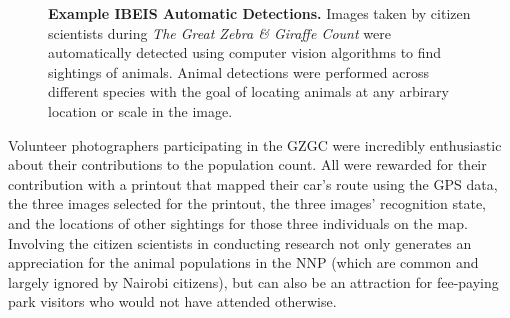 \begin{figure}[t]
    \caption[Example IBEIS Automatic Detections]{\textbf{Example IBEIS Automatic Detections.}  Images taken by citizen scientists during \textit{The Great Zebra \& Giraffe Count} were automatically detected using computer vision algorithms to find sightings of animals.  Animal detections were performed across different species with the goal of locating animals at any arbirary location or scale in the image.}
        \label{fig:detections}
\end{figure}

Volunteer photographers participating in the GZGC were incredibly enthusiastic about their contributions to the population count.  All were rewarded for their contribution with a printout that mapped their car's route using the GPS data, the three images selected for the printout, the three images' recognition state, and the locations of other sightings for those three individuals on the map.  Involving the citizen scientists in conducting research not only generates an appreciation for the animal populations in the NNP (which are common and largely ignored by Nairobi citizens), but can also be an attraction for fee-paying park visitors who would not have attended otherwise.


